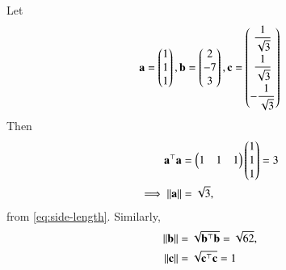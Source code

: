 Let 
\begin{align}
	\mathbf{a} = \begin{pmatrix}1\\1\\1\end{pmatrix} , \mathbf{b} = \begin{pmatrix}2\\ -7 \\ 3\end{pmatrix}, 
\mathbf{c} = \begin{pmatrix}\dfrac{1}{\sqrt{3}}\\[2ex] \dfrac{1}{\sqrt{3}} \\[2ex] -\dfrac{1}{\sqrt{3}}\end{pmatrix} 
\label{eq:chapters/12/10/2/1/1}
\end{align}
Then
\begin{align}
	{\mathbf{a}^{\top}\mathbf{a}} &= \begin{pmatrix}1  &  1  &  1\end{pmatrix}\begin{pmatrix}1\\1\\1\end{pmatrix} = 3
\\
\implies 
	\left\lVert\mathbf{a}\right\rVert&=\sqrt{3}, 
	\label{eq:chapters/12/10/2/1/3}
\end{align}
		from \eqref{eq:side-length}. Similarly,
\begin{align}
	\left\lVert\mathbf{b}\right\rVert&=\sqrt{\mathbf{b}^{\top}\mathbf{b}}= \sqrt{62}, 
	\label{eq:chapters/12/10/2/1/4}
	\\ \left\lVert\mathbf{c}\right\rVert&=\sqrt{\mathbf{c}^{\top}\mathbf{c}}	
=1
	\label{eq:chapters/12/10/2/1/5}
\end{align}



